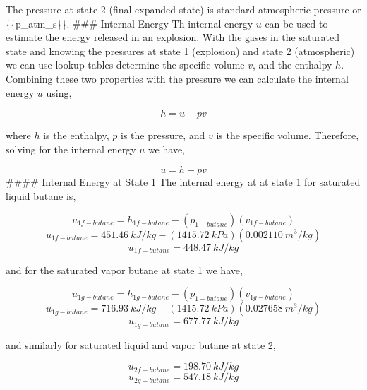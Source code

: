 \documentclass[10pt,parskip=half,
toc=sectionentrywithdots,
bibliography=totocnumbered,
captions=tableheading,numbers=noendperiod]{scrartcl}
\begin{document}
The pressure at state 2 (final expanded state) is standard atmospheric
pressure or \{\{p\_atm\_s\}\}. \#\#\# Internal Energy Th internal energy
\(u\) can be used to estimate the energy released in an explosion. With
the gases in the saturated state and knowing the pressures at state 1
(explosion) and state 2 (atmospheric) we can use lookup tables determine
the specific volume \(v\), and the enthalpy \(h\). Combining these two
properties with the pressure we can calculate the internal energy \(u\)
using,

\begin{equation}h = u + pv\end{equation}

where \(h\) is the enthalpy, \(p\) is the pressure, and \(v\) is the
specific volume. Therefore, solving for the internal energy \(u\) we
have,

\begin{equation}u = h - pv\end{equation} \#\#\#\# Internal Energy at
State 1 The internal energy at at state 1 for saturated liquid butane
is,

\begin{equation}u_{1f-butane} = h_{1f-butane} - (p_{1-butane})(v_{1f-butane})\end{equation}
\begin{equation}u_{1f-butane} = 451.46\:kJ/kg - (1415.72\:kPa)(0.002110\:m^3/kg)\end{equation}
\begin{equation}u_{1f-butane} = 448.47\:kJ/kg\end{equation}

and for the saturated vapor butane at state 1 we have,

\begin{equation}u_{1g-butane} = h_{1g-butane} - (p_{1-butane})(v_{1g-butane})\end{equation}
\begin{equation}u_{1g-butane} = 716.93\:kJ/kg - (1415.72\:kPa)(0.027658\:m^3/kg)\end{equation}
\begin{equation}u_{1g-butane} = 677.77\:kJ/kg\end{equation}

and similarly for saturated liquid and vapor butane at state 2,

\begin{equation}u_{2f-butane} = 198.70\:kJ/kg\end{equation}
\begin{equation}u_{2g-butane} = 547.18\:kJ/kg\end{equation}
\end{document}

